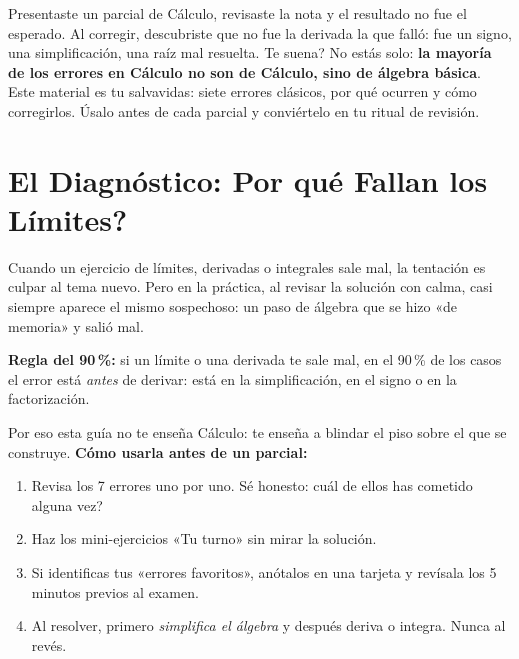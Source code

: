 \documentclass[12pt, letterpaper]{article}
\begin{document}

\vspace{6pt}
\begin{cuadroinfo}
  \small
  Presentaste un parcial de Cálculo, revisaste la nota y el resultado no fue el esperado. Al corregir, descubriste que no fue la derivada la que falló: fue un signo, una simplificación, una raíz mal resuelta. \textquestiondown Te suena? No estás solo: \textbf{la mayoría de los errores en Cálculo no son de Cálculo, sino de álgebra básica}. Este material es tu salvavidas: siete errores clásicos, por qué ocurren y cómo corregirlos. Úsalo antes de cada parcial y conviértelo en tu ritual de revisión.
\end{cuadroinfo}

\section{El Diagnóstico: \textquestiondown Por qué Fallan los Límites?}

Cuando un ejercicio de límites, derivadas o integrales sale mal, la tentación es culpar al tema nuevo. Pero en la práctica, al revisar la solución con calma, casi siempre aparece el mismo sospechoso: un paso de álgebra que se hizo «de memoria» y salió mal.

\begin{cuadroteoria}
  \textbf{Regla del 90\,\%:} si un límite o una derivada te sale mal, en el 90\,\% de los casos el error está \emph{antes} de derivar: está en la simplificación, en el signo o en la factorización.
\end{cuadroteoria}

\noindent Por eso esta guía no te enseña Cálculo: te enseña a blindar el piso sobre el que se construye. \textbf{Cómo usarla antes de un parcial:}

\begin{enumerate}[leftmargin=*]
  \item Revisa los 7 errores uno por uno. Sé honesto: \textquestiondown cuál de ellos has cometido alguna vez?
  \item Haz los mini-ejercicios «Tu turno» sin mirar la solución.
  \item Si identificas tus «errores favoritos», anótalos en una tarjeta y revísala los 5 minutos previos al examen.
  \item Al resolver, primero \emph{simplifica el álgebra} y después deriva o integra. Nunca al revés.
\end{enumerate}
\end{document}
